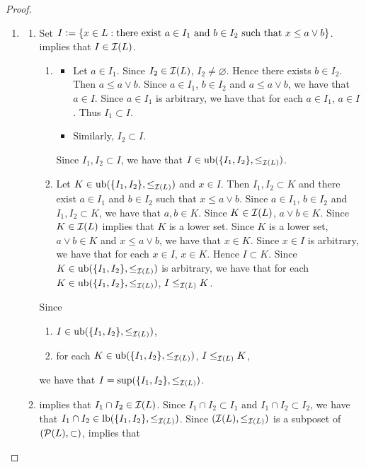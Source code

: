 \documentclass{book}
\begin{document}
	\begin{proof}\
		\begin{enumerate}
			\item 
			\begin{enumerate}
				\item Set $I \vcentcolon= \{x \in L: \text{there exist $a \in I_1$ and $b \in I_2$ such that $x \leq a \vee b$} \}$.  implies that $I \in \mathcal{I}(L)$.
				\begin{enumerate}
					\item 
					\begin{itemize}
						\item Let $a \in I_1$. Since $I_2 \in \mathcal{I}(L)$, $I_2 \neq \varnothing$. Hence there exists $b \in I_2$. Then $a \leq a \vee b$. Since $a \in I_1$, $b \in I_2$ and $a \leq a \vee b$, we have that $a \in I$. Since $a \in I_1$ is arbitrary, we have that for each $a \in I_1$, $a \in I$. Thus $I_1 \subset I$. 
						\item Similarly, $I_2 \subset I$.
					\end{itemize}
					Since $I_1,I_2 \subset I$, we have that $I \in \operatorname{ub}(\{I_1, I_2\}, \leq_{\mathcal{I}(L)})$. 
					\item Let $K \in \operatorname{ub}(\{I_1, I_2\}, \leq_{\mathcal{I}(L)})$ and $x \in I$. Then $I_1, I_2 \subset K$ and there exist $a \in I_1$ and $b \in I_2$ such that $x \leq a \vee b$. Since $a \in I_1$, $b \in I_2$ and $I_1, I_2 \subset K$, we have that $a,b \in K$. Since $K \in \mathcal{I}(L)$, $a \vee b \in K$. Since $K \in \mathcal{I}(L)$  implies that $K$ is a lower set. Since $K$ is a lower set, $a \vee b \in K$ and $x \leq a \vee b$, we have that $x \in K$. Since $x \in I$ is arbitrary, we have that for each $x \in I$, $x \in K$. Hence $I \subset K$. Since $K \in \operatorname{ub}(\{I_1, I_2\}, \leq_{\mathcal{I}(L)})$ is arbitrary, we have that for each $K \in \operatorname{ub}(\{I_1, I_2\}, \leq_{\mathcal{I}(L)})$, $I \leq_{\mathcal{I}(L)} K$.
				\end{enumerate}
				Since 
				\begin{enumerate}
					\item $I \in \operatorname{ub}(\{I_1, I_2\}, \leq_{\mathcal{I}(L)})$, 
					\item for each $K \in \operatorname{ub}(\{I_1, I_2\}, \leq_{\mathcal{I}(L)})$, $I \leq_{\mathcal{I}(L)} K$,
				\end{enumerate}
				we have that $I = \sup(\{I_1, I_2\}, \leq_{\mathcal{I}(L)})$.
				\item {} implies that $I_1 \cap I_2 \in \mathcal{I}(L)$. Since $I_1 \cap I_2 \subset I_1$ and $I_1 \cap I_2 \subset I_2$, we have that $I_1 \cap I_2 \in \operatorname{lb}(\{I_1, I_2\}, \leq_{\mathcal{I}(L)})$. Since $(\mathcal{I}(L), \leq_{\mathcal{I}(L)})$ is a subposet of $(\mathcal{P}(L), \subset)$,  implies that

\end{enumerate}
\end{enumerate}
\end{proof}
\end{document}
